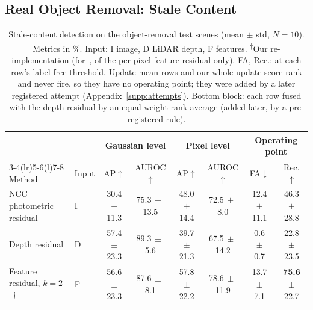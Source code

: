 \documentclass[journal]{IEEEtran}
\newcommand{\reimpl}{\textsuperscript{$\dagger$}}   %
\begin{document}
\subsection{Real Object Removal: Stale Content}
\label{sec:exp-change}
\begin{table}[t]
\centering
\caption{Stale-content detection on the object-removal test scenes (mean $\pm$ std, $N=10$). Metrics in \%. Input: I image, D LiDAR depth, F features. \reimpl Our re-implementation (for~\cite{ackermann2025clsplats, jiang2026mif}, of the per-pixel feature residual only). FA, Rec.: at each row's label-free threshold. Update-mean rows and our whole-update score rank and never fire, so they have no operating point; they were added by a later registered attempt (Appendix~\ref{supp:attempts}). Bottom block: each row fused with the depth residual by an equal-weight rank average (added later, by a pre-registered rule).}
\label{tab:change}
\footnotesize
\setlength{\tabcolsep}{4pt}
\begin{tabular}{@{}llcccccc@{}}
\toprule
& & \multicolumn{2}{c}{Gaussian level} & \multicolumn{2}{c}{Pixel level}
& \multicolumn{2}{c}{Operating point}\\
\cmidrule(lr){3-4}\cmidrule(lr){5-6}\cmidrule(l){7-8}
Method & Input & AP$\uparrow$ & AUROC$\uparrow$ & AP$\uparrow$ & AUROC$\uparrow$
& FA$\downarrow$ & Rec.$\uparrow$\\
\midrule
NCC photometric residual & I & 30.4{\scriptsize$\,\pm\,$11.3} & 75.3{\scriptsize$\,\pm\,$13.5} & 48.0{\scriptsize$\,\pm\,$14.4} & 72.5{\scriptsize$\,\pm\,$8.0} & 12.4{\scriptsize$\,\pm\,$11.1} & 46.3{\scriptsize$\,\pm\,$28.8}\\
Depth residual & D & 57.4{\scriptsize$\,\pm\,$23.3} & 89.3{\scriptsize$\,\pm\,$5.6} & 39.7{\scriptsize$\,\pm\,$21.3} & 67.5{\scriptsize$\,\pm\,$14.2} & \underline{0.6}{\scriptsize$\,\pm\,$0.7} & 22.8{\scriptsize$\,\pm\,$23.5}\\
Feature residual, $k=2$~\cite{ackermann2025clsplats, jiang2026mif}\reimpl & F & 56.6{\scriptsize$\,\pm\,$23.3} & 87.6{\scriptsize$\,\pm\,$8.1} & 57.8{\scriptsize$\,\pm\,$22.2} & 78.6{\scriptsize$\,\pm\,$11.9} & 13.7{\scriptsize$\,\pm\,$7.1} & \textbf{75.6}{\scriptsize$\,\pm\,$22.7}\\

\end{tabular}
\end{table}
\end{document}

